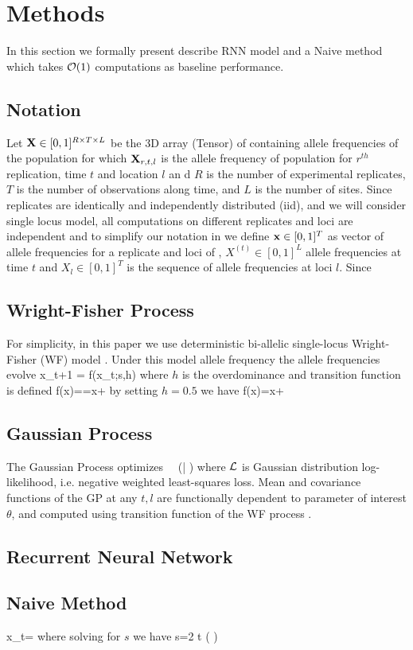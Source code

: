 \section{Methods}
In this section we formally present describe RNN model and a Naive method which takes ${\cal O}(1)$ computations as baseline performance.

\subsection{Notation}
Let ${\mathbf X} \in [0,1]^{R \times T \times L}$  be the 3D array (Tensor) of containing allele frequencies of the population for which ${\mathbf X}_{r,t,l}$ is the allele frequency of population for $r^{th}$ replication, time $t$ and location $l$ an d $R$ is the number of experimental replicates, $T$ is the number of observations along time, and $L$ is the number of sites. Since replicates are identically and independently distributed (iid), and we will consider single locus model, all computations on different replicates and loci are independent and to simplify our notation in we define ${\mathbf x}\in [0,1]^{T}$ as vector of allele frequencies for a replicate and loci of , $X^{(t)}\in [0,1]^L$ allele frequencies at time $t$ and $X_l\in [0,1]^T$ is the sequence of allele frequencies at loci $l$. Since

\subsection{Wright-Fisher Process}
For simplicity, in this paper we use deterministic bi-allelic single-locus Wright-Fisher (WF) model \cite{book-mathpopgen}. Under this model allele frequency the allele frequencies evolve
\beq
x_{t+1} = f(x_t;s,h) 
\eeq
where $h$ is the overdominance and transition function is defined 
\beq
f(x)==x+
\eeq
by setting $h=0.5$ we have
\beq
f(x)=x+
\eeq


\subsection{Gaussian Process}
The Gaussian Process optimizes
\beq
\underset{\theta}{ \arg \max} \ \ \Lc(\bfX | \theta)
\eeq
where ${\cal L}$ is Gaussian distribution log-likelihood, i.e. negative weighted least-squares loss. Mean and covariance functions of the GP at any $t,l$ are functionally dependent to parameter of interest $\theta$, and computed using transition function of the WF process \cite{EandR-GP}.
\subsection{Recurrent Neural Network}
\cite{ilya-thesis}
\citep{backprop}

\subsection{Naive Method}
\cite{multilocus-hitchhike}

\beq
x_t=
\eeq
where solving for $s$ we have
\beq
s=2 t \log \left(  \right)
\eeq
